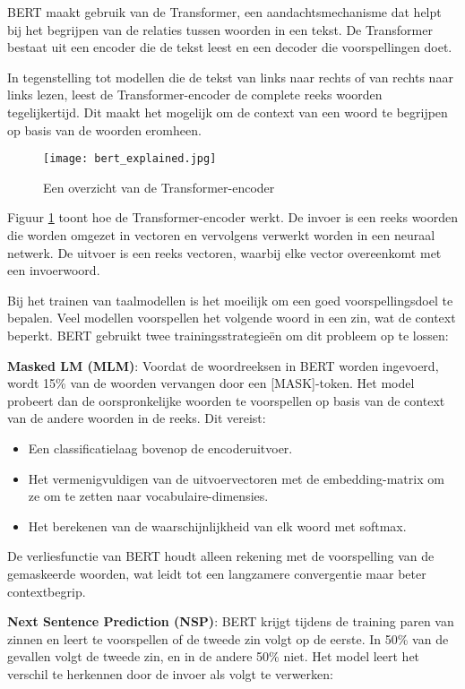 BERT maakt gebruik van de Transformer, een aandachtsmechanisme dat helpt bij het begrijpen van de relaties tussen woorden in een tekst. De Transformer bestaat uit een encoder die de tekst leest en een decoder die voorspellingen doet.

In tegenstelling tot modellen die de tekst van links naar rechts of van rechts naar links lezen, leest de Transformer-encoder de complete reeks woorden tegelijkertijd. Dit maakt het mogelijk om de context van een woord te begrijpen op basis van de woorden eromheen.

\begin{figure}[ht]
    \centering
    \texttt{[image: bert\_explained.jpg]}
    \caption{Een overzicht van de Transformer-encoder}
    \label{fig:bert_explained}
\end{figure}

Figuur \ref{fig:bert_explained} toont hoe de Transformer-encoder werkt. De invoer is een reeks woorden die worden omgezet in vectoren en vervolgens verwerkt worden in een neuraal netwerk. De uitvoer is een reeks vectoren, waarbij elke vector overeenkomt met een invoerwoord.

Bij het trainen van taalmodellen is het moeilijk om een goed voorspellingsdoel te bepalen. Veel modellen voorspellen het volgende woord in een zin, wat de context beperkt. BERT gebruikt twee trainingsstrategieën om dit probleem op te lossen:

\textbf{Masked LM (MLM)}: Voordat de woordreeksen in BERT worden ingevoerd, wordt 15\% van de woorden vervangen door een [MASK]-token. Het model probeert dan de oorspronkelijke woorden te voorspellen op basis van de context van de andere woorden in de reeks. Dit vereist:

\begin{itemize}
    \item Een classificatielaag bovenop de encoderuitvoer.
    \item Het vermenigvuldigen van de uitvoervectoren met de embedding-matrix om ze om te zetten naar vocabulaire-dimensies.
    \item Het berekenen van de waarschijnlijkheid van elk woord met softmax.
\end{itemize}

De verliesfunctie van BERT houdt alleen rekening met de voorspelling van de gemaskeerde woorden, wat leidt tot een langzamere convergentie maar beter contextbegrip.

\textbf{Next Sentence Prediction (NSP)}: BERT krijgt tijdens de training paren van zinnen en leert te voorspellen of de tweede zin volgt op de eerste. In 50\% van de gevallen volgt de tweede zin, en in de andere 50\% niet. Het model leert het verschil te herkennen door de invoer als volgt te verwerken:

